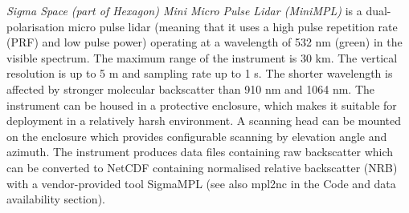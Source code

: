 \textit{Sigma Space (part of Hexagon) Mini Micro Pulse Lidar (MiniMPL)} \citep{spinhirne1993,campbell2002,flynn2007} is a
dual-polarisation micro pulse lidar (meaning that it uses a high pulse repetition rate (PRF) and low pulse power)
operating at a wavelength of 532 nm (green) in the visible spectrum. The maximum range of the
instrument is 30 km. The vertical resolution is up to 5 m and sampling rate up
to 1 s. The shorter wavelength is affected
by stronger molecular backscatter than 910 nm and 1064 nm.
The instrument can be housed in a protective enclosure, which makes it suitable
for deployment in a relatively harsh environment. A scanning head can be
mounted on the enclosure which provides configurable scanning by elevation
angle and azimuth. The instrument produces data files containing raw
backscatter which can be converted to NetCDF containing normalised relative
backscatter (NRB) with a vendor-provided tool SigmaMPL
(see also mpl2nc in the Code and data availability section).

\begin{table}
\caption[Reanalyses and models used in the case studies and some of their main
properties]{
Reanalyses and models used in the case studies and some of their main
properties. The temporal and horizontal grid resolution and vertical levels listed is the
resolution of the model output available. The horizontal grid resolution is determined at 45\unit{^\circ}S.
The internal resolution of the model may be different
(see Sect. \ref{sec:3:reanalyses-and-models} for details). The reanalyses and the
UM use regular longitude-latitude grids, while the AMPS horizontal grid is
regular in the South Pole stereographic projection.
}
\label{tab:3:models}
\centering
{}
\end{table}

